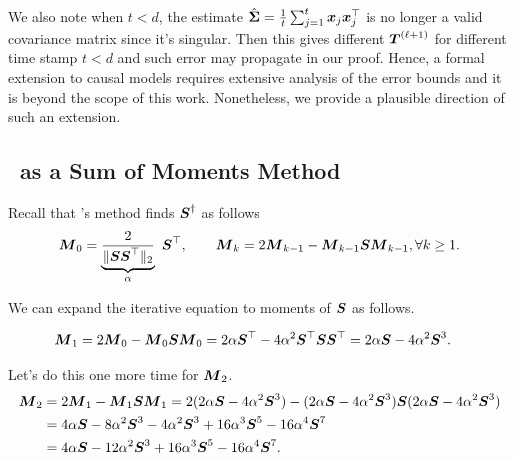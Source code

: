 {\begin{remark}
We also note when $t < d$, the estimate  $\hat{\boldsymbol{\Sigma}} = \frac{1}{t}\sum_{j=1}^t \boldsymbol{x}_j  \boldsymbol{x}_j^\top$ is no longer a valid covariance matrix since it's singular. Then this gives different $\boldsymbol{T}^{(\ell+1)}$ for different time stamp $t < d$ and such error may propagate in our proof. Hence, a formal extension to causal models requires extensive analysis of the error bounds and it is beyond the scope of this work. Nonetheless, we provide a plausible direction of such an extension. 
    
\end{remark}
}



\subsection{\newton\ as a Sum of Moments Method}\label{sec:newton_moment}
Recall that \newton's method finds $\boldsymbol{S}^\dagger$ as follows 
\begin{equation}
    \boldsymbol{M}_0 = \underbrace{\frac{2}{\|\boldsymbol{S}\boldsymbol{S}^\top\|_2}}_{\alpha} ~ \boldsymbol{S}^\top, \qquad \boldsymbol{M}_k = 2 \boldsymbol{M}_{k-1} - \boldsymbol{M}_{k-1} \boldsymbol{S} \boldsymbol{M}_{k-1}, \forall k \geq 1.
\end{equation}

We can expand the iterative equation to moments of $\boldsymbol{S}$ as follows. 

\begin{equation}
    \begin{aligned}
        \boldsymbol{M}_1 &= 2 \boldsymbol{M}_0 - \boldsymbol{M}_0 \boldsymbol{S} \boldsymbol{M}_0  = 2 \alpha \boldsymbol{S}^\top - 4 \alpha^2 \boldsymbol{S}^\top \boldsymbol{S} \boldsymbol{S}^\top = 2 \alpha \boldsymbol{S} - 4 \alpha^2 \boldsymbol{S}^3 .
    \end{aligned}
\end{equation}


Let's do this one more time for $\boldsymbol{M}_2$.
\begin{equation}
    \begin{aligned}
        \boldsymbol{M}_2 &= 2 \boldsymbol{M}_{1} - \boldsymbol{M}_{1} \boldsymbol{S} \boldsymbol{M}_{1} = 2 (2 \alpha \boldsymbol{S} - 4 \alpha^2 \boldsymbol{S}^3) - (2 \alpha \boldsymbol{S} - 4 \alpha^2 \boldsymbol{S}^3) \boldsymbol{S} (2 \alpha \boldsymbol{S} - 4 \alpha^2 \boldsymbol{S}^3) \\
        &= 4 \alpha \boldsymbol{S} - 8 \alpha^2 \boldsymbol{S}^3 - 4 \alpha^2 \boldsymbol{S}^3 + 16 \alpha^3 \boldsymbol{S}^5 - 16\alpha^4 \boldsymbol{S}^7 \\
        &= 4 \alpha \boldsymbol{S} - 12 \alpha^2 \boldsymbol{S}^3  + 16 \alpha^3 \boldsymbol{S}^5 - 16\alpha^4 \boldsymbol{S}^7.
    \end{aligned}
\end{equation}

